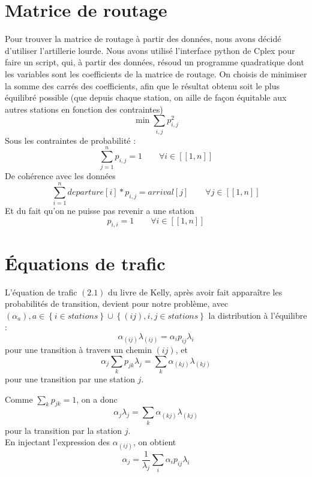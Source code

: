 \documentclass[12pt,a4paper]{article}
\begin{document}
\section{Matrice de routage}

Pour trouver la matrice de routage à partir des données, nous avons décidé d'utiliser l'artillerie lourde. Nous avons utilisé l'interface python de Cplex pour faire un script, qui, à partir des données, résoud un programme quadratique dont les variables sont les coefficients de la matrice de routage.
On choisis de minimiser la somme des carrés des coefficients, afin que le résultat obtenu soit le plus équilibré possible (que depuis chaque station, on aille de façon équitable aux autres stations en fonction des contraintes)
\[ 
	\min \sum_{i,j} p_{i,j}^2
\]
Sous les contraintes de probabilité :
\[
	\sum_{j=1}^n p_{i,j} = 1 \qquad \forall i \in [\![1,n]\!]
\]
De cohérence avec les données
\[
	\sum_{i=1}^n departure[i]*p_{i,j} = arrival[j] \qquad \forall j \in [\![1,n]\!]
\]
Et du fait qu'on ne puisse pas revenir a une station
\[
	p_{i,i} = 1 \qquad \forall i \in [\![1,n]\!]
\]


\section{\'Equations de trafic}

L'équation de trafic $(2.1)$ du livre de Kelly, après avoir fait apparaître les probabilités de transition, devient pour notre problème, avec $(\alpha_a), a \in \left\{ i \in stations \right\} \cup \left\{ (ij), i,j \in stations \right\}$  la distribution à l'équilibre :
\begin{equation}
\alpha_{(ij)} \lambda_{(ij)} = \alpha_i p_{ij} \lambda_i
\label{eq:trafic_1}
\end{equation}
pour une transition à travers un chemin $(ij)$, et
\begin{equation}
\alpha_j \sum_k p_{jk} \lambda_j = \sum_k \alpha_{(kj)} \lambda_{(kj)}
\label{eq:trafic_2}
\end{equation}
pour une transition par une station $j$.

Comme $\sum_k p_{jk} = 1$, on a donc
\begin{equation}
\alpha_j \lambda_j = \sum_k \alpha_{(kj)} \lambda_{(kj)}
\label{eq:trafic_2_bis}
\end{equation}
pour la transition par la station $j$.\\

En injectant l'expression des $\alpha_{(ij)}$, on obtient
\begin{equation}
\alpha_j = \frac{1}{\lambda_j} \sum_i \alpha_i p_{ij} \lambda_i
\label{eq:trafic_2_ter}
\end{equation}
\end{document}
